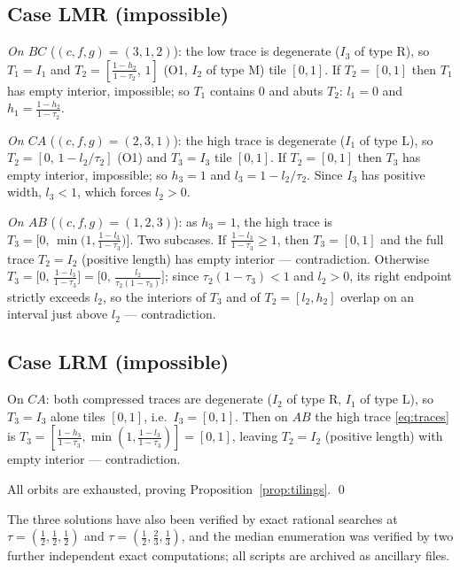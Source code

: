 \documentclass[11pt,reqno]{amsart}
\theoremstyle{plain}
\theoremstyle{definition}
\theoremstyle{remark}
\begin{document}
\subsection*{Case LMR \textup(impossible\textup)}
\emph{On $BC$} ($(c,f,g)=(3,1,2)$): the low trace is degenerate ($I_3$ of type
$\mathrm R$), so $T_1=I_1$ and $T_2=[\tfrac{1-h_2}{1-\tau_2},\,1]$ (O1, $I_2$
of type $\mathrm M$) tile $[0,1]$. If $T_2=[0,1]$ then $T_1$ has empty
interior, impossible; so $T_1$ contains $0$ and abuts $T_2$: $l_1=0$ and
$h_1=\tfrac{1-h_2}{1-\tau_2}$.

\emph{On $CA$} ($(c,f,g)=(2,3,1)$): the high trace is degenerate ($I_1$ of type
$\mathrm L$), so $T_2=[0,\,1-l_2/\tau_2]$ (O1) and $T_3=I_3$ tile $[0,1]$. If
$T_2=[0,1]$ then $T_3$ has empty interior, impossible; so $h_3=1$ and
$l_3=1-l_2/\tau_2$. Since $I_3$ has positive width, $l_3<1$, which forces
$l_2>0$.

\emph{On $AB$} ($(c,f,g)=(1,2,3)$): as $h_3=1$, the high trace is
$T_3=\bigl[0,\,\min\bigl(1,\tfrac{1-l_3}{1-\tau_3}\bigr)\bigr]$. Two subcases.
If $\tfrac{1-l_3}{1-\tau_3}\ge1$, then $T_3=[0,1]$ and the full trace
$T_2=I_2$ (positive length) has empty interior --- contradiction. Otherwise
$T_3=\bigl[0,\,\tfrac{1-l_3}{1-\tau_3}\bigr]
=\bigl[0,\,\tfrac{l_2}{\tau_2(1-\tau_3)}\bigr]$; since $\tau_2(1-\tau_3)<1$
and $l_2>0$, its right endpoint strictly exceeds $l_2$, so the interiors of
$T_3$ and of $T_2=[l_2,h_2]$ overlap on an interval just above $l_2$ ---
contradiction.

\subsection*{Case LRM \textup(impossible\textup)}
On $CA$: both compressed traces are degenerate ($I_2$ of type $\mathrm R$,
$I_1$ of type $\mathrm L$), so $T_3=I_3$ alone tiles $[0,1]$, i.e.\
$I_3=[0,1]$. Then on $AB$ the high trace \eqref{eq:traces} is
$T_3=[\tfrac{1-h_3}{1-\tau_3},\min(1,\tfrac{1-l_3}{1-\tau_3})]=[0,1]$, leaving
$T_2=I_2$ (positive length) with empty interior --- contradiction.

\medskip
All orbits are exhausted, proving Proposition~\ref{prop:tilings}. \qed

\medskip
The three solutions have also been verified by exact rational searches at
$\tau=(\tfrac12,\tfrac12,\tfrac12)$ and $\tau=(\tfrac12,\tfrac23,\tfrac13)$,
and the median enumeration was verified by two further independent exact
computations; all scripts are archived as ancillary files.
\end{document}

